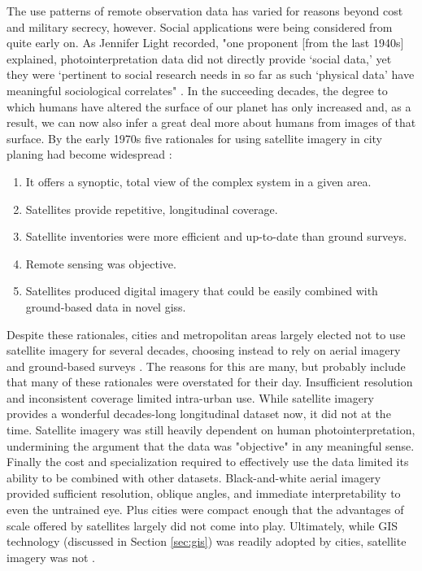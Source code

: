 The use patterns of remote observation data has varied for reasons beyond cost and military secrecy, however. Social applications were being considered from quite early on. As Jennifer Light recorded, "one proponent [from the last 1940s] explained, photointerpretation data did not directly provide `social data,' yet they were `pertinent to social research needs in so far as such `physical data' have meaningful sociological correlates" \cite{lightWarfareWelfareDefense2005}. In the succeeding decades, the degree to which humans have altered the surface of our planet has only increased and, as a result, we can now also infer a great deal more about humans from images of that surface. By the early 1970s five rationales for using satellite imagery in city planing had become widespread \cite{lightWarfareWelfareDefense2005}:

\begin{enumerate}[itemsep=0pt,parsep=0pt]
	\item{It offers a synoptic, total view of the complex system in a given area.}
	\item{Satellites provide repetitive, longitudinal coverage.}
	\item{Satellite inventories were more efficient and up-to-date than ground surveys.}
	\item{Remote sensing was objective.}
	\item{Satellites produced digital imagery that could be easily combined with ground-based data in novel \acp{gis}.}
\end{enumerate}

Despite these rationales, cities and metropolitan areas largely elected not to use satellite imagery for several decades, choosing instead to rely on aerial imagery and ground-based surveys \cite{lightWarfareWelfareDefense2005}. The reasons for this are many, but probably include that many of these rationales were overstated for their day. Insufficient resolution and inconsistent coverage limited intra-urban use. While satellite imagery provides a wonderful decades-long longitudinal dataset now, it did not at the time. Satellite imagery was still heavily dependent on human photointerpretation, undermining the argument that the data was "objective" in any meaningful sense. Finally the cost and specialization required to effectively use the data limited its ability to be combined with other datasets. Black-and-white aerial imagery provided sufficient resolution, oblique angles, and immediate interpretability to even the untrained eye. Plus cities were compact enough that the advantages of scale offered by satellites largely did not come into play. Ultimately, while GIS technology (discussed in Section \ref{sec:gis}) was readily adopted by cities, satellite imagery was not \cite{lightWarfareWelfareDefense2005}.

